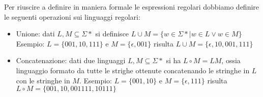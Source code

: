 \documentclass[a4paper]{report}
\theoremstyle{definition}%
\begin{document}
  Per riuscire a definire in maniera formale le espressioni regolari dobbiamo definire le seguenti operazioni sui linguaggi regolari:
  \begin{itemize}
  \item Unione: dati $L,M \subseteq \Sigma*$ si definisce $L \cup M = \{w \in \Sigma* | w \in L \vee w \in M\}$
    Esempio: $L = \{001, 10, 111\}$ e $M = \{\epsilon, 001\}$ risulta $L \cup M = \{\epsilon, 10, 001, 111\}$

  \item Concatenazione: dati due linguaggi $L, M \subseteq \Sigma*$ si ha $L \circ M = LM$, ossia linguaggio formato da tutte le strighe
    ottenute concatenando le stringhe in $L$ con le stringhe in $M$.
    Esempio: $L = \{001,10\}$ e $M = \{\epsilon, 111\}$ risulta $L \circ M = \{001, 10, 001111, 10111\}$
    

\end{itemize}
\end{document}
